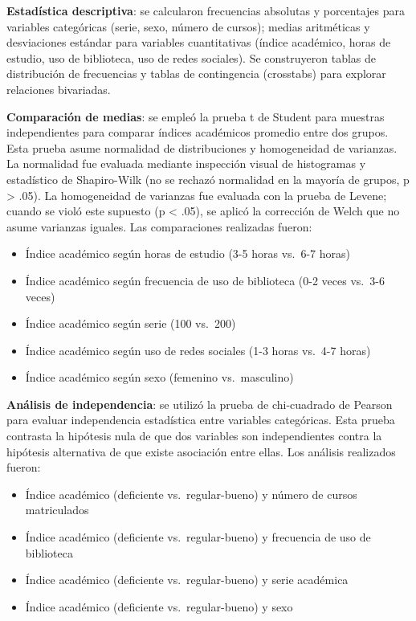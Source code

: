 \documentclass[
  stu,
  floatsintext,
  longtable,
  a4paper,
  nolmodern,
  notxfonts,
  notimes,
  12pt,
  colorlinks=true,linkcolor=blue,citecolor=blue,urlcolor=blue]{apa7}
\providecommand{\tightlist}{%
  \setlength{\itemsep}{0pt}\setlength{\parskip}{0pt}}
\begin{document}
\textbf{Estadística descriptiva}: se calcularon frecuencias absolutas y
porcentajes para variables categóricas (serie, sexo, número de cursos);
medias aritméticas y desviaciones estándar para variables cuantitativas
(índice académico, horas de estudio, uso de biblioteca, uso de redes
sociales). Se construyeron tablas de distribución de frecuencias y
tablas de contingencia (crosstabs) para explorar relaciones bivariadas.

\textbf{Comparación de medias}: se empleó la prueba t de Student para
muestras independientes para comparar índices académicos promedio entre
dos grupos. Esta prueba asume normalidad de distribuciones y
homogeneidad de varianzas. La normalidad fue evaluada mediante
inspección visual de histogramas y estadístico de Shapiro-Wilk (no se
rechazó normalidad en la mayoría de grupos, p \textgreater{} .05). La
homogeneidad de varianzas fue evaluada con la prueba de Levene; cuando
se violó este supuesto (p \textless{} .05), se aplicó la corrección de
Welch que no asume varianzas iguales. Las comparaciones realizadas
fueron:

\begin{itemize}
\tightlist
\item
  Índice académico según horas de estudio (3-5 horas vs.~6-7 horas)
\item
  Índice académico según frecuencia de uso de biblioteca (0-2 veces
  vs.~3-6 veces)
\item
  Índice académico según serie (100 vs.~200)
\item
  Índice académico según uso de redes sociales (1-3 horas vs.~4-7 horas)
\item
  Índice académico según sexo (femenino vs.~masculino)
\end{itemize}

\textbf{Análisis de independencia}: se utilizó la prueba de chi-cuadrado
de Pearson para evaluar independencia estadística entre variables
categóricas. Esta prueba contrasta la hipótesis nula de que dos
variables son independientes contra la hipótesis alternativa de que
existe asociación entre ellas. Los análisis realizados fueron:

\begin{itemize}
\tightlist
\item
  Índice académico (deficiente vs.~regular-bueno) y número de cursos
  matriculados
\item
  Índice académico (deficiente vs.~regular-bueno) y frecuencia de uso de
  biblioteca
\item
  Índice académico (deficiente vs.~regular-bueno) y serie académica
\item
  Índice académico (deficiente vs.~regular-bueno) y sexo
\end{itemize}
\end{document}
